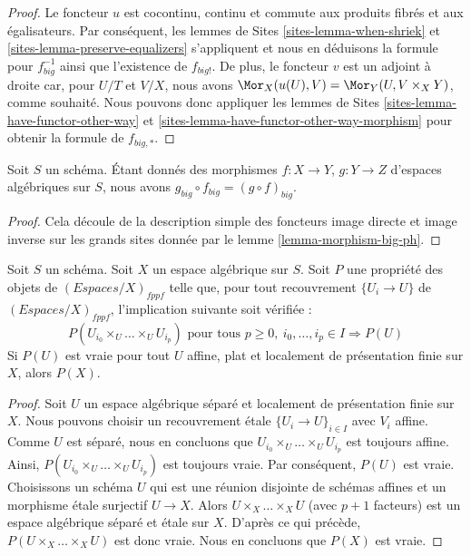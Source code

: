 \begin{proof}
Le foncteur $u$ est cocontinu, continu et commute aux produits fibrés
et aux égalisateurs. Par conséquent,
les lemmes de Sites \ref{sites-lemma-when-shriek} et
\ref{sites-lemma-preserve-equalizers}
s'appliquent et nous en déduisons la formule
pour $f_{big}^{-1}$ ainsi que l'existence de $f_{big!}$. De plus,
le foncteur $v$ est un adjoint à droite car, pour $U/T$ et $V/X$,
nous avons $\Mor_X(u(U), V) = \Mor_Y(U, V \times_X Y)$,
comme souhaité. Nous pouvons donc appliquer
les lemmes de Sites \ref{sites-lemma-have-functor-other-way} et
\ref{sites-lemma-have-functor-other-way-morphism} pour obtenir la
formule de $f_{big, *}$.
\end{proof}

\begin{lemma}
\label{lemma-composition-ph}
Soit $S$ un schéma. Étant donnés des morphismes $f : X \to Y$, $g : Y \to Z$
d'espaces algébriques sur $S$, nous avons
$g_{big} \circ f_{big} = (g \circ f)_{big}$.
\end{lemma}

\begin{proof}
Cela découle de la description simple des foncteurs image directe
et image inverse sur les grands sites donnée par le
lemme \ref{lemma-morphism-big-ph}.
\end{proof}

\begin{lemma}
\label{lemma-cech-enough}
Soit $S$ un schéma. Soit $X$ un espace algébrique sur $S$.
Soit $P$ une propriété des objets de $(\textit{Espaces}/X)_{fppf}$
telle que, pour tout recouvrement $\{U_i \to U\}$ de
$(\textit{Espaces}/X)_{fppf}$, l'implication suivante soit vérifiée :
$$
P(U_{i_0} \times_U \ldots \times_U U_{i_p})
\text{ pour tous }
p \geq 0,\ i_0, \ldots, i_p \in I
\Rightarrow P(U)
$$
Si $P(U)$ est vraie pour tout $U$ affine, plat et localement de présentation finie sur $X$,
alors $P(X)$.
\end{lemma}

\begin{proof}
Soit $U$ un espace algébrique séparé et localement de présentation finie sur $X$.
Nous pouvons choisir un recouvrement \'etale $\{U_i \to U\}_{i \in I}$ avec $V_i$
affine. Comme $U$ est séparé, nous en concluons que
$U_{i_0} \times_U \ldots \times_U U_{i_p}$ est toujours affine.
Ainsi, $P(U_{i_0} \times_U \ldots \times_U U_{i_p})$ est toujours vraie.
Par conséquent, $P(U)$ est vraie. Choisissons un schéma $U$ qui est une réunion disjointe de
schémas affines et un morphisme \'etale surjectif $U \to X$.
Alors $U \times_X \ldots \times_X U$ (avec $p + 1$ facteurs)
est un espace algébrique séparé
et \'etale sur $X$. D'après ce qui précède, $P(U \times_X \ldots \times_X U)$ est donc vraie.
Nous en concluons que $P(X)$ est vraie.
\end{proof}













